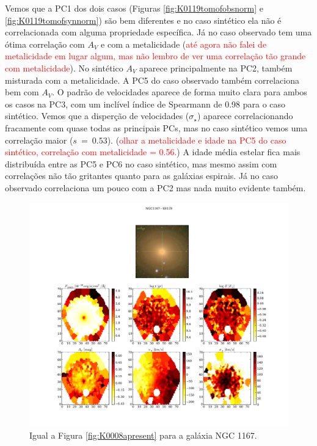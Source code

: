 Vemos que a PC1 dos dois casos (Figuras \ref{fig:K0119tomofobsnorm} e \ref{fig:K0119tomofsynnorm}) são bem diferentes e
no caso sintético ela não é correlacionada com alguma propriedade específica. Já no caso observado tem uma ótima
correlação com $A_V$ e com a metalicidade (\ojo \textcolor{red}{até agora não falei de metalicidade em lugar algum, mas
não lembro de ver uma correlação tão grande com metalicidade}). No sintético $A_V$ aparece principalmente na PC2, também
misturada com a metalicidade. A PC5 do caso observado também correlaciona bem com $A_V$. O padrão de velocidades aparece
de forma muito clara para ambos os casos na PC3, com um inclível índice de Spearmann de 0.98 para o caso sintético.
Vemos que a disperção de velocidades ($\sigma_\star$) aparece correlacionando fracamente com quase todas as principais
PCs, mas no caso sintético vemos uma correlação maior ($s\ =\ 0.53$). (\ojo \textcolor{red}{olhar a metalicidade e
idade na PC5 do caso sintético, correlação com metalicidade = 0.56.}) A idade média estelar fica mais distribuída entre
as PC5 e PC6 no caso sintético, mas mesmo assim com correlações não tão gritantes quanto para as galáxias espirais. Já
no caso observado correlaciona um pouco com a PC2 mas nada muito evidente também.

\begin{figure}
    \includegraphics[width=1.\textwidth]{figuras/K0119-apresent.pdf}
    \caption[Propriedades f\'isicas da gal\'axia NGC 1167.]
    {Igual a Figura \ref{fig:K0008apresent} para a galáxia NGC 1167.}
    \label{fig:K0119apresent}
\end{figure}

